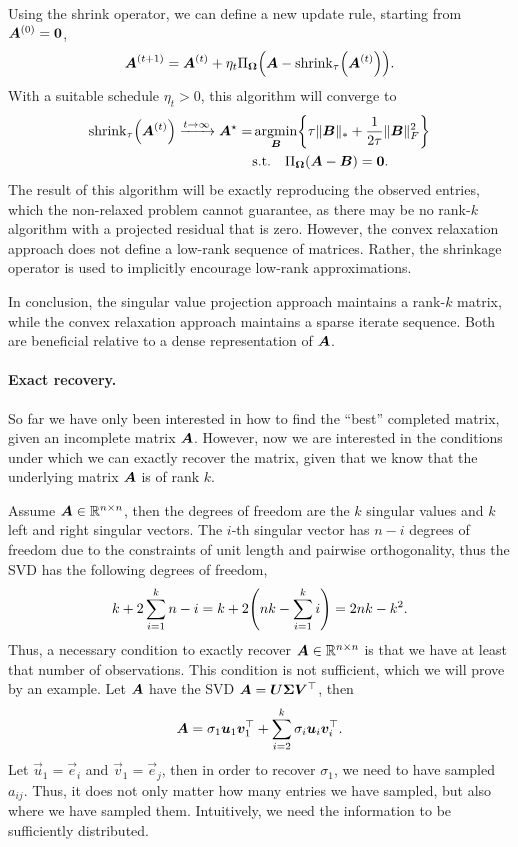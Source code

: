 Using the shrink operator, we can define a new update rule, starting from $\bm{A}^{(0)} =
    \bm{0}$, \[
    \mat{A}^{(t+1)} = \mat{A}^{(t)} + \eta_t \Pi_{\mat{\Omega}}\lft( \mat{A} - \mathrm{shrink}_{\tau}\lft( \mat{A}^{(t)} \rgt) \rgt).
\]
With a suitable schedule $\eta_t > 0$, this algorithm will converge to
\begin{align*}
    \mathrm{shrink}_{\tau}\lft( \mat{A}^{(t)} \rgt) \xrightarrow{t\to \infty} \mat{A}^\star = & \argmin_{\mat{B}} \lft\{ \tau \| \mat{B} \|_* + \frac{1}{2\tau} \| \mat{B} \|_F^2 \rgt\} \\
                                                                                              & \mathrm{s.t.} \quad \Pi_{\mat{\Omega}}(\mat{A} - \mat{B}) = \mat{0}.
\end{align*}
The result of this algorithm will be exactly reproducing the observed entries, which the non-relaxed
problem cannot guarantee, as there may be no rank-$k$ algorithm with a projected residual that is
zero. However, the convex relaxation approach does not define a low-rank sequence of matrices.
Rather, the shrinkage operator is used to implicitly encourage low-rank approximations.

In conclusion, the singular value projection approach maintains a rank-$k$ matrix, while the convex
relaxation approach maintains a sparse iterate sequence. Both are beneficial relative to a dense
representation of $\bm{A}$.

\paragraph{Exact recovery.}

So far we have only been interested in how to find the ``best'' completed matrix, given an
incomplete matrix $\bm{A}$. However, now we are interested in the conditions under which we can
exactly recover the matrix, given that we know that the underlying matrix $\bm{A}$ is of rank $k$.

Assume $\bm{A} \in \mathbb{R}^{n \times n}$, then the degrees of freedom are the $k$ singular values and
$k$ left and right singular vectors. The $i$-th singular vector has $n-i$ degrees of freedom due to
the constraints of unit length and pairwise orthogonality, thus the SVD has the following degrees
of freedom, \[
    k + 2\sum_{i=1}^{k} n - i = k + 2 \lft( nk - \sum_{i=1}^{k} i \rgt) = 2nk - k^2.
\]
Thus, a necessary condition to exactly recover $\bm{A} \in \mathbb{R}^{n\times n}$ is that we have at
least that number of observations. This condition is not sufficient, which we will prove by an
example. Let $\bm{A}$ have the SVD $\bm{A} = \bm{U} \bm{\Sigma} \bm{V}^\top$, then \[
    \bm{A} = \sigma_1 \bm{u}_1 \bm{v}_1^\top + \sum_{i=2}^{k} \sigma_i \bm{u}_i \bm{v}_i^\top.
\]
Let $\vec{u}_1 = \vec{e}_i$ and $\vec{v}_1 = \vec{e}_j$, then in order to recover $\sigma_1$, we
need to have sampled $a_{ij}$. Thus, it does not only matter how many entries we have sampled, but
also where we have sampled them. Intuitively, we need the information to be sufficiently
distributed.

